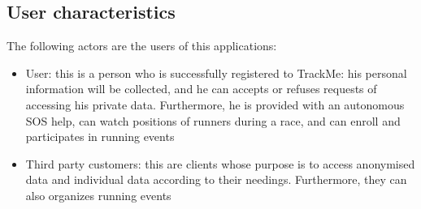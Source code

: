 \subsection{User characteristics}
The following actors are the users of this applications:

\begin{itemize}
\item User: this is a person who is successfully registered to TrackMe: his personal information will be collected, and he can accepts or refuses requests of accessing his private data. 
Furthermore, he is provided with an autonomous SOS help, can watch positions of runners during a race, and can enroll and participates in running events  
\item Third party customers: this are clients whose purpose is to access anonymised data and individual data according to their needings.
Furthermore, they can also organizes running events
\end{itemize}